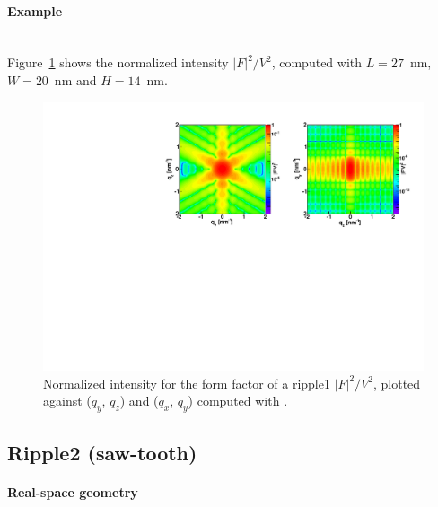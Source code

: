 \paragraph{Example}\strut\\
Figure~\ref{fig:FFripple1Ex} shows the normalized intensity
$|F|^2/V^2$, computed with $L=27$~nm, $W=20$~nm and $H=14$~nm.

\begin{figure}[H]
\begin{center}
\includegraphics[angle=-90,width=\textwidth]{fig/ff/figffripple1.pdf}
\end{center}
\caption{Normalized intensity for the form factor of a ripple1
  $|F|^2/V^2$, plotted against ($q_y$, $q_z$) and  ($q_x$, $q_y$)
  computed with .}
\label{fig:FFripple1Ex}
\end{figure}


\clearpage
\subsection{Ripple2 (saw-tooth)} \label{sec:Ripple2}  

\paragraph{Real-space geometry}\strut\\

